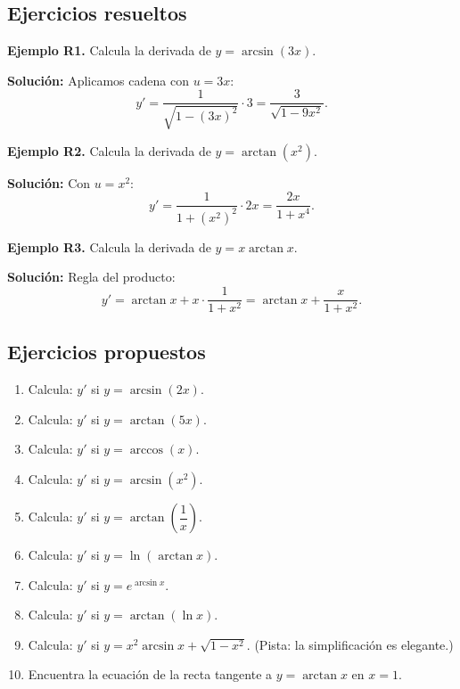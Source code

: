 \documentclass[12pt, a4paper]{article}
\begin{document}
\subsection{Ejercicios resueltos}

\textbf{Ejemplo R1.} Calcula la derivada de $y = \arcsin(3x)$.

\begin{cuadrosolucion}
  \textbf{Solución:} Aplicamos cadena con $u = 3x$:
  $$y' = \frac{1}{\sqrt{1 - (3x)^2}} \cdot 3 = \frac{3}{\sqrt{1 - 9x^2}}.$$
\end{cuadrosolucion}

\textbf{Ejemplo R2.} Calcula la derivada de $y = \arctan(x^2)$.

\begin{cuadrosolucion}
  \textbf{Solución:} Con $u = x^2$:
  $$y' = \frac{1}{1 + (x^2)^2} \cdot 2x = \frac{2x}{1 + x^4}.$$
\end{cuadrosolucion}

\textbf{Ejemplo R3.} Calcula la derivada de $y = x \arctan x$.

\begin{cuadrosolucion}
  \textbf{Solución:} Regla del producto:
  $$y' = \arctan x + x \cdot \frac{1}{1 + x^2} = \arctan x + \frac{x}{1 + x^2}.$$
\end{cuadrosolucion}


\subsection{Ejercicios propuestos}

\begin{enumerate}[leftmargin=*, resume]
  \item \facil{} Calcula: $y'$ si $y = \arcsin(2x)$.
  \item \facil{} Calcula: $y'$ si $y = \arctan(5x)$.
  \item \facil{} Calcula: $y'$ si $y = \arccos(x)$.
  \item \medio{} Calcula: $y'$ si $y = \arcsin(x^2)$.
  \item \medio{} Calcula: $y'$ si $y = \arctan\left(\dfrac{1}{x}\right)$.
  \item \medio{} Calcula: $y'$ si $y = \ln(\arctan x)$.
  \item \medio{} Calcula: $y'$ si $y = e^{\arcsin x}$.
  \item \dificil{} Calcula: $y'$ si $y = \arctan(\ln x)$.
  \item \dificil{} Calcula: $y'$ si $y = x^2 \arcsin x + \sqrt{1 - x^2}$. (Pista: la simplificación es elegante.)
  \item \dificil{} Encuentra la ecuación de la recta tangente a $y = \arctan x$ en $x = 1$.
\end{enumerate}
\end{document}
